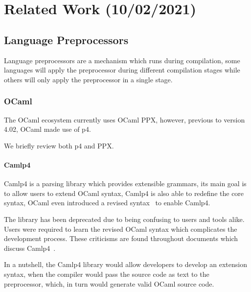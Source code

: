 \chapter{Related Work (10/02/2021)}\label{cha:related-work}

\section{Language Preprocessors}\label{sec:lang-preprocessors}
Language preprocessors are a mechanism which runs during compilation,
some languages will apply the preprocessor during different compilation stages while others will only apply the preprocessor in a single stage.


\subsection{OCaml}\label{sec:lang-preprocessors:ocaml}

The OCaml ecosystem currently uses OCaml \gls{PPX},
however, previous to version 4.02, OCaml made use of \gls{p4}.

We briefly review both \gls{p4} and \gls{PPX}.

\subsubsection*{Camlp4}\label{sec:lang-preprocessors:ocaml:p4}

Camlp4 is a parsing library which provides extensible grammars,
its main goal is to allow users to extend OCaml syntax,
Camlp4 is also able to redefine the core syntax,
OCaml even introduced a revised syntax~\autocite{Rauglaudre2003} to enable Camlp4.

The library has been deprecated due to being confusing to users and tools alike.
Users were required to learn the revised OCaml syntax which complicates the development process.
These criticisms are found throughout documents which discuss Camlp4~\autocite{Whitequark2014}.

In a nutshell, the Camlp4 library would allow developers to develop an extension syntax,
when the compiler would pass the source code as text to the preprocessor,
which, in turn would generate valid OCaml source code.

